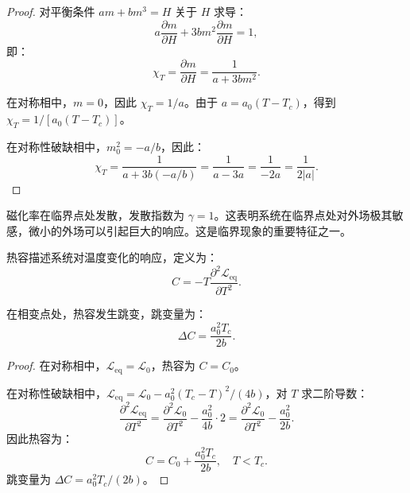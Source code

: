 \begin{proof}
对平衡条件 $am + bm^3 = H$ 关于 $H$ 求导：
\begin{equation}
    a \frac{\partial m}{\partial H} + 3b m^2 \frac{\partial m}{\partial H} = 1,
\end{equation}
即：
\begin{equation}
    \chi_T = \frac{\partial m}{\partial H} = \frac{1}{a + 3b m^2}.
\end{equation}

在对称相中，$m = 0$，因此 $\chi_T = 1/a$。由于 $a = a_0(T - T_c)$，得到 $\chi_T = 1/[a_0(T - T_c)]$。

在对称性破缺相中，$m_0^2 = -a/b$，因此：
\begin{equation}
    \chi_T = \frac{1}{a + 3b(-a/b)} = \frac{1}{a - 3a} = \frac{1}{-2a} = \frac{1}{2|a|}.
\end{equation}
\end{proof}

\begin{remark}
磁化率在临界点处发散，发散指数为 $\gamma = 1$。这表明系统在临界点处对外场极其敏感，微小的外场可以引起巨大的响应。这是临界现象的重要特征之一。
\end{remark}

\begin{definition}[热容]
热容描述系统对温度变化的响应，定义为：
\begin{equation}
    C = -T \frac{\partial^2 \mathcal{L}_{\text{eq}}}{\partial T^2}.
\end{equation}
\end{definition}

\begin{theorem}[朗道理论的热容跳变]
在相变点处，热容发生跳变，跳变量为：
\begin{equation}
    \Delta C = \frac{a_0^2 T_c}{2b}.
\end{equation}
\end{theorem}

\begin{proof}
在对称相中，$\mathcal{L}_{\text{eq}} = \mathcal{L}_0$，热容为 $C = C_0$。

在对称性破缺相中，$\mathcal{L}_{\text{eq}} = \mathcal{L}_0 - a_0^2(T_c - T)^2/(4b)$，对 $T$ 求二阶导数：
\begin{equation}
    \frac{\partial^2 \mathcal{L}_{\text{eq}}}{\partial T^2} = \frac{\partial^2 \mathcal{L}_0}{\partial T^2} - \frac{a_0^2}{4b} \cdot 2 = \frac{\partial^2 \mathcal{L}_0}{\partial T^2} - \frac{a_0^2}{2b}.
\end{equation}
因此热容为：
\begin{equation}
    C = C_0 + \frac{a_0^2 T_c}{2b}, \quad T < T_c.
\end{equation}
跳变量为 $\Delta C = a_0^2 T_c / (2b)$。
\end{proof}

